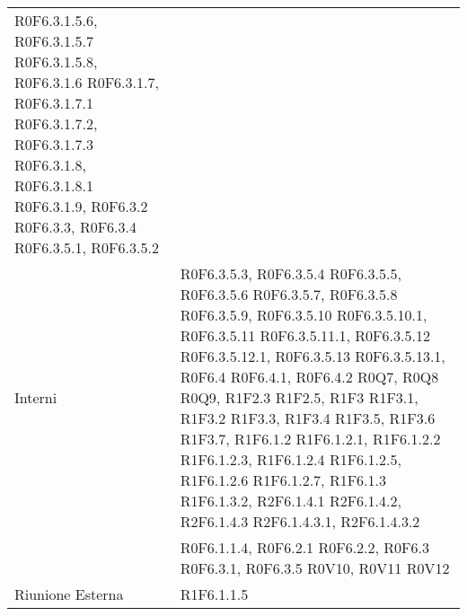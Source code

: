\begin{longtable}{p{2.5cm}!{\VRule[1pt]}p{5.5cm}}
R0F6.3.1.5.6, R0F6.3.1.5.7 \newline
R0F6.3.1.5.8, R0F6.3.1.6 \newline
R0F6.3.1.7, R0F6.3.1.7.1 \newline
R0F6.3.1.7.2, R0F6.3.1.7.3 \newline
R0F6.3.1.8, R0F6.3.1.8.1 \newline
R0F6.3.1.9, R0F6.3.2 \newline
R0F6.3.3, R0F6.3.4 \newline
R0F6.3.5.1, R0F6.3.5.2 \\
Interni & R0F6.3.5.3, R0F6.3.5.4 \newline
R0F6.3.5.5, R0F6.3.5.6 \newline
R0F6.3.5.7, R0F6.3.5.8 \newline
R0F6.3.5.9, R0F6.3.5.10 \newline
R0F6.3.5.10.1, R0F6.3.5.11 \newline
R0F6.3.5.11.1, R0F6.3.5.12 \newline
R0F6.3.5.12.1, R0F6.3.5.13 \newline
R0F6.3.5.13.1, R0F6.4 \newline
R0F6.4.1, R0F6.4.2 \newline
R0Q7, R0Q8 \newline
R0Q9, R1F2.3 \newline
R1F2.5, R1F3 \newline
R1F3.1, R1F3.2 \newline
R1F3.3, R1F3.4 \newline
R1F3.5, R1F3.6 \newline
R1F3.7, R1F6.1.2 \newline
R1F6.1.2.1, R1F6.1.2.2 \newline
R1F6.1.2.3, R1F6.1.2.4 \newline
R1F6.1.2.5, R1F6.1.2.6 \newline
R1F6.1.2.7, R1F6.1.3 \newline
R1F6.1.3.2, R2F6.1.4.1 \newline
R2F6.1.4.2, R2F6.1.4.3 \newline
R2F6.1.4.3.1, R2F6.1.4.3.2 \\
 & R0F6.1.1.4, R0F6.2.1 \newline
R0F6.2.2, R0F6.3 \newline
R0F6.3.1, R0F6.3.5 \newline
R0V10, R0V11 \newline
R0V12\\
Riunione Esterna & R1F6.1.1.5 \newline

\end{longtable}
